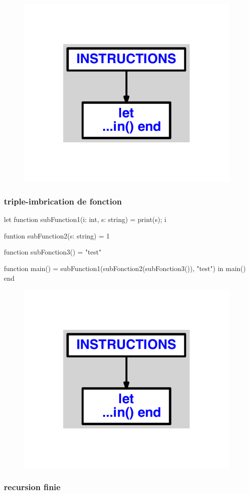 \documentclass{article}
\begin{document}
\begin{figure}[H]\centering\includegraphics[max width=\textwidth]{ast/ast_235.pdf}\end{figure}\subsubsection{triple-imbrication de fonction}
\begin{verbatimtab}
let
	function subFunction1(i: int, s: string) =
		print(s);
		i

	funtion subFunction2(s: string) = 1

	function subFonction3() = "test"

	function main() = subFunction1(subFonction2(subFonction3()), "test")
in main() end
\end{verbatimtab}
\begin{figure}[H]\centering\includegraphics[max width=\textwidth]{ast/ast_236.pdf}\end{figure}\subsubsection{recursion finie}
\end{document}
